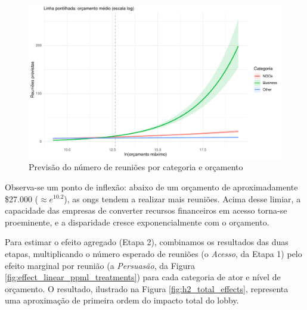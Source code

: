 \begin{figure}[htbp]
    \centering
    \includegraphics[width=\textwidth]{figures/h2_test/fig_pred_meetings_vs_budget_centered_by_category.pdf}
    \caption{Previsão do número de reuniões por categoria e orçamento}
    \label{fig:h2_pred_meetings}
\end{figure}

Observa-se um ponto de inflexão: abaixo de um orçamento de aproximadamente \$27.000 ($\approx e^{10.2}$), as \acrshort{ong}s tendem a realizar mais reuniões. Acima desse limiar, a capacidade das empresas de converter recursos financeiros em acesso torna-se proeminente, e a disparidade cresce exponencialmente com o orçamento.

Para estimar o efeito agregado (Etapa 2), combinamos os resultados das duas etapas, multiplicando o número esperado de reuniões (o \textit{Acesso}, da Etapa 1) pelo efeito marginal por reunião (a \textit{Persuasão}, da Figura \ref{fig:effect_linear_ppml_treatments}) para cada categoria de ator e nível de orçamento. O resultado, ilustrado na Figura \ref{fig:h2_total_effects}, representa uma aproximação de primeira ordem do impacto total do lobby.

